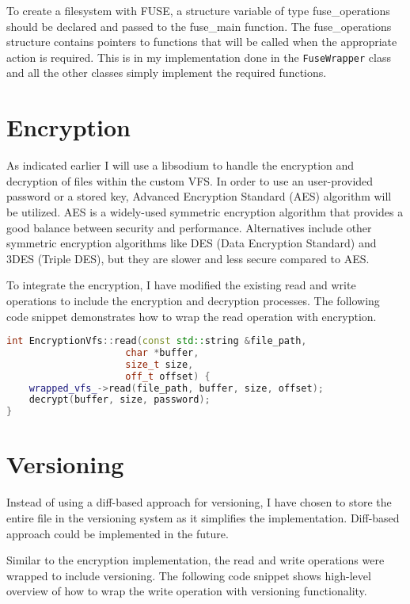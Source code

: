 To create a filesystem with FUSE, a structure variable of type fuse\_operations should be declared and passed to the fuse\_main function.
The fuse\_operations structure contains pointers to functions that will be called when the appropriate action is required.
This is in my implementation done in the \texttt{FuseWrapper} class and all the other classes simply implement the required functions.

\section{Encryption}\label{sec:encryption}

As indicated earlier I will use a libsodium to handle the encryption and decryption of files within the custom VFS\@.
In order to use an user-provided password or a stored key, Advanced Encryption Standard (AES) algorithm will be utilized.
AES is a widely-used symmetric encryption algorithm that provides a good balance between security and performance.
Alternatives include other symmetric encryption algorithms like DES (Data Encryption Standard) and 3DES (Triple DES), but they are slower and less secure compared to AES.

To integrate the encryption, I have modified the existing read and write operations to include the encryption and decryption processes.
The following code snippet demonstrates how to wrap the read operation with encryption.

\begin{lstlisting}[language=c++, basicstyle=\ttfamily\small]
int EncryptionVfs::read(const std::string &file_path,
                     char *buffer,
                     size_t size,
                     off_t offset) {
    wrapped_vfs_->read(file_path, buffer, size, offset);
    decrypt(buffer, size, password);
}
\end{lstlisting}


\section{Versioning}\label{sec:versioning2}

Instead of using a diff-based approach for versioning, I have chosen to store the entire file in the versioning system as it simplifies the implementation.
Diff-based approach could be implemented in the future.

Similar to the encryption implementation, the read and write operations were wrapped to include versioning.
The following code snippet shows high-level overview of how to wrap the write operation with versioning functionality.

